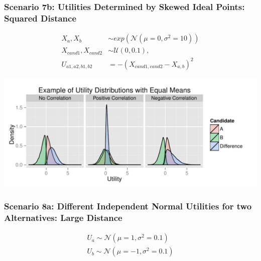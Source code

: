 \documentclass[12pt]{article}\usepackage[]{graphicx}\usepackage[]{color}
\makeatletter
\def\maxwidth{ %
  \ifdim\Gin@nat@width>\linewidth
    \linewidth
  \else
    \Gin@nat@width
  \fi
}
\newenvironment{knitrout}{}{} %
\makeatother
\begin{document}
\clearpage
\subsubsection*{Scenario 7b: Utilities Determined by Skewed Ideal Points: Squared Distance}
\begin{align*}
X_a,X_b &\sim exp(\mathcal{N}(\mu=0,\sigma^2=10)) \\
X_{cand1},X_{cand2} &\sim \mathcal{U}(0,0.1), \\
U_{a1,a2,b1,b2} &= -(X_{cand1,cand2}-X_{a,b})^2
\end{align*}

\begin{knitrout}
\color{fgcolor}
\includegraphics[width=\maxwidth]{figure/unnamed-chunk-14} 

\end{knitrout}


\clearpage
\subsubsection*{Scenario 8a: Different Independent Normal Utilities for two Alternatives: Large Distance}

\begin{align*}
U_a \sim \mathcal{N}(\mu=1,\sigma^2=0.1)\\
U_b \sim \mathcal{N}(\mu=-1,\sigma^2=0.1)
\end{align*}
\end{document}
